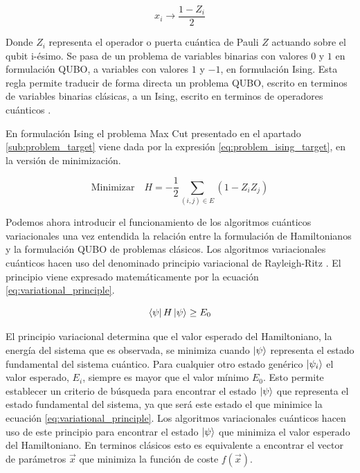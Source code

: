 \begin{equation}
    x_{i} \longrightarrow \frac{1 - Z_{i}}{2}
    \label{eq:qubo_ising}
\end{equation}

Donde $Z_{i}$ representa el operador o puerta cuántica de Pauli $Z$ actuando sobre el qubit i-ésimo. Se pasa de un problema de variables binarias con valores $0$ y $1$ en formulación \mbox{QUBO}, a variables con valores $1$ y $-1$, en formulación Ising. Esta regla permite traducir de forma directa un problema \mbox{QUBO}, escrito en terminos de variables binarias clásicas, a un Ising, escrito en terminos de operadores cuánticos \citep{lucas}.

\newpage

En formulación Ising el problema Max Cut presentado en el apartado \ref{sub:problem_target} viene dada por la expresión \ref{eq:problem_ising_target}, en la versión de minimización.

\begin{equation}
    \text{Minimizar} \quad H =  - \frac{1}{2}\sum_{(i,j) \in E} (1 - Z_i Z_j)
    \label{eq:problem_ising_target}
\end{equation}

Podemos ahora introducir el funcionamiento de los algoritmos cuánticos variacionales una vez entendida la relación entre la formulación de Hamiltonianos y la formulación  \mbox{QUBO} de problemas clásicos. Los algoritmos variacionales cuánticos hacen uso del denominado principio variacional de Rayleigh-Ritz \citep{fernandez}. El principio viene expresado matemáticamente por la ecuación \ref{eq:variational_principle}.

\begin{equation}
    \bra{\psi} H \ket{\psi} \geq E_{0}
    \label{eq:variational_principle}
\end{equation}

El principio variacional determina que el valor esperado del Hamiltoniano, la energía del sistema que es observada, se minimiza cuando $\ket{\psi}$ representa el estado fundamental del sistema cuántico. Para cualquier otro estado genérico $\ket{\psi_{i}}$ el valor esperado, $E_{i}$, siempre es mayor que el valor mínimo $E_{0}$. Esto permite establecer un criterio de búsqueda para encontrar el estado $\ket{\psi}$ que representa el estado fundamental del sistema, ya que será este estado el que minimice la ecuación \ref{eq:variational_principle}. Los algoritmos variacionales cuánticos hacen uso de este principio para encontrar el estado $\ket{\psi}$ que minimiza el valor esperado del Hamiltoniano. En terminos clásicos esto es equivalente a encontrar el vector de parámetros $\Vec{x}$ que minimiza la función de coste $f(\Vec{x})$. \\

